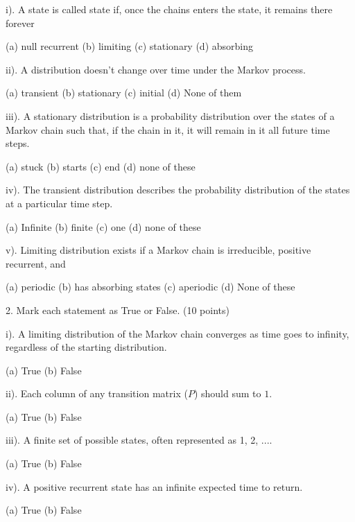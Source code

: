 \documentclass[6pt]{article}
\begin{document}
\vspace{10pt}

i). A state is called \hspace{30pt} state if, once the chains enters the state, it remains there forever

(a) null recurrent (b) limiting (c) stationary (d) absorbing

ii). A \hspace{30pt} distribution doesn’t change over time under the Markov process.

(a) transient (b) stationary (c) initial (d) None of them

iii). A stationary distribution is a probability distribution over the states of a Markov chain such that, if the chain \hspace{30pt} in it, it will remain in it all future time steps.

(a) stuck (b) starts (c) end (d) none of these 

iv). The transient distribution describes the probability distribution of the states at a particular\hspace{30pt} time step.

(a) Infinite (b) finite (c) one (d) none of these 

v). Limiting distribution exists if a Markov chain is irreducible, positive recurrent, and\hspace{30pt}

(a) periodic (b) has absorbing states (c) aperiodic (d) None of these

\vspace{10pt}

2. Mark each statement as True or False. (10 points)

\vspace{10pt}

i). A limiting distribution of the Markov chain converges as time goes to infinity, regardless of the starting distribution.

(a) True (b) False

ii). Each column of any transition matrix ($P$) should sum to $1$.

(a) True (b) False 

iii). A finite set of possible states, often represented as {1, 2, ...}. 

(a) True (b) False 

iv). A positive recurrent state has an infinite expected time to return.

(a) True (b) False 
\end{document}
